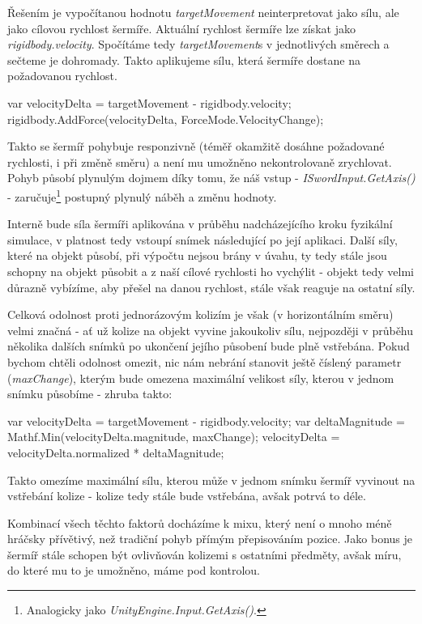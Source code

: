 Řešením je vypočítanou hodnotu \textit{targetMovement} neinterpretovat jako sílu, ale jako cílovou rychlost šermíře. Aktuální rychlost šermíře lze získat jako \textit{rigidbody.velocity}. Spočítáme tedy \textit{targetMovement}s v jednotlivých směrech a sečteme je dohromady. Takto aplikujeme sílu, která šermíře dostane na požadovanou rychlost. 

\begin{code}
 var velocityDelta = targetMovement - rigidbody.velocity;
 rigidbody.AddForce(velocityDelta, ForceMode.VelocityChange);
\end{code}


Takto se šermíř pohybuje responzivně (téměř okamžitě dosáhne požadované rychlosti, i při změně směru) a není mu umožněno nekontrolovaně zrychlovat. Pohyb působí plynulým dojmem díky tomu, že náš vstup - \textit{ISwordInput.GetAxis()} - zaručuje\footnote{Analogicky jako \textit{UnityEngine.Input.GetAxis()}.} postupný plynulý náběh a změnu hodnoty.

Interně bude síla šermíři aplikována v průběhu nadcházejícího kroku fyzikální simulace, v platnost tedy vstoupí snímek následující po její aplikaci. Další síly, které na objekt působí, při výpočtu nejsou brány v úvahu, ty tedy stále jsou schopny na objekt působit a z naší cílové rychlosti ho vychýlit - objekt tedy velmi důrazně vybízíme, aby přešel na danou rychlost, stále však reaguje na ostatní síly. 

Celková odolnost proti jednorázovým kolizím je však (v horizontálním směru) velmi značná - ať už kolize na objekt vyvine jakoukoliv sílu, nejpozději v průběhu několika dalších snímků po ukončení jejího působení bude plně vstřebána. Pokud bychom chtěli odolnost omezit, nic nám nebrání stanovit ještě číslený parametr (\textit{maxChange}), kterým bude omezena maximální velikost síly, kterou v jednom snímku působíme - zhruba takto:

\begin{code}
 var velocityDelta = targetMovement - rigidbody.velocity;
 var deltaMagnitude = Mathf.Min(velocityDelta.magnitude, maxChange);
 velocityDelta = velocityDelta.normalized * deltaMagnitude;
\end{code}

Takto omezíme maximální sílu, kterou může v jednom snímku šermíř vyvinout na vstřebání kolize - kolize tedy stále bude vstřebána, avšak potrvá to déle.

Kombinací všech těchto faktorů docházíme k mixu, který není o mnoho méně hráčsky přívětivý, než tradiční pohyb přímým přepisováním pozice. Jako bonus je šermíř stále schopen být ovlivňován kolizemi s ostatními předměty, avšak míru, do které mu to je umožněno, máme pod kontrolou.

